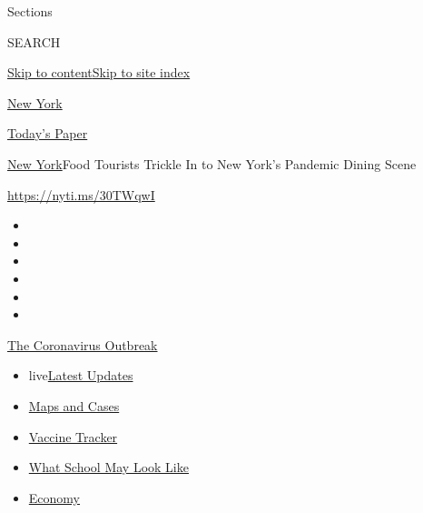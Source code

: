 Sections

SEARCH

\protect\hyperlink{site-content}{Skip to
content}\protect\hyperlink{site-index}{Skip to site index}

\href{https://www.nytimes3xbfgragh.onion/section/nyregion}{New York}

\href{https://myaccount.nytimes3xbfgragh.onion/auth/login?response_type=cookie\&client_id=vi}{}

\href{https://www.nytimes3xbfgragh.onion/section/todayspaper}{Today's
Paper}

\href{/section/nyregion}{New York}\textbar{}Food Tourists Trickle In to
New York's Pandemic Dining Scene

\url{https://nyti.ms/30TWqwI}

\begin{itemize}
\item
\item
\item
\item
\item
\item
\end{itemize}

\href{https://www.nytimes3xbfgragh.onion/news-event/coronavirus?action=click\&pgtype=Article\&state=default\&region=TOP_BANNER\&context=storylines_menu}{The
Coronavirus Outbreak}

\begin{itemize}
\tightlist
\item
  live\href{https://www.nytimes3xbfgragh.onion/2020/08/02/world/coronavirus-updates.html?action=click\&pgtype=Article\&state=default\&region=TOP_BANNER\&context=storylines_menu}{Latest
  Updates}
\item
  \href{https://www.nytimes3xbfgragh.onion/interactive/2020/us/coronavirus-us-cases.html?action=click\&pgtype=Article\&state=default\&region=TOP_BANNER\&context=storylines_menu}{Maps
  and Cases}
\item
  \href{https://www.nytimes3xbfgragh.onion/interactive/2020/science/coronavirus-vaccine-tracker.html?action=click\&pgtype=Article\&state=default\&region=TOP_BANNER\&context=storylines_menu}{Vaccine
  Tracker}
\item
  \href{https://www.nytimes3xbfgragh.onion/interactive/2020/07/29/us/schools-reopening-coronavirus.html?action=click\&pgtype=Article\&state=default\&region=TOP_BANNER\&context=storylines_menu}{What
  School May Look Like}
\item
  \href{https://www.nytimes3xbfgragh.onion/live/2020/07/31/business/stock-market-today-coronavirus?action=click\&pgtype=Article\&state=default\&region=TOP_BANNER\&context=storylines_menu}{Economy}
\end{itemize}

